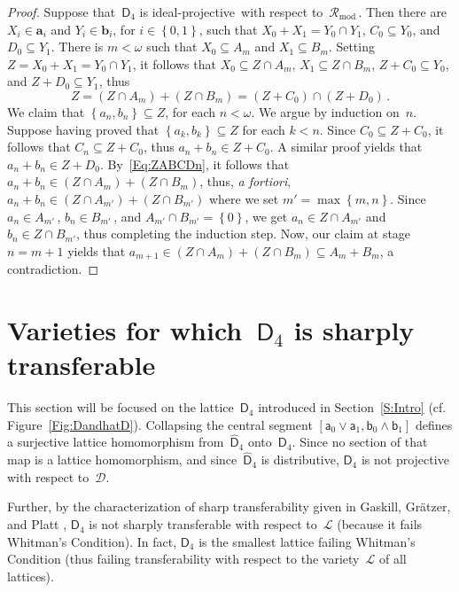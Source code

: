 \documentclass[reqno]{amsart}
\numberwithin{equation}{section}
\theoremstyle{plain}
\theoremstyle{definition}
\theoremstyle{remark}
\numberwithin{figure}{section}
\numberwithin{table}{section}
\begin{document}
\begin{proof}
Suppose that~${\mathsf{D}_{4}}$ is {i\-de\-al-pro\-jec\-tive}\ with respect to~${\mathcal{R}_{\mathrm{mod}}}$\,.
Then there are $X_i\in{\boldsymbol{a}}_i$ and $Y_i\in{\boldsymbol{b}}_i$, for $i\in{\left\{{0,1}\right\}}$, such that $X_0+X_1=Y_0\cap Y_1$, $C_0\subseteq Y_0$, and $D_0\subseteq Y_1$.
There is $m<{\omega}$ such that $X_0\subseteq A_m$ and $X_1\subseteq B_m$.
Setting $Z=X_0+X_1=Y_0\cap Y_1$, it follows that $X_0\subseteq Z\cap A_m$, $X_1\subseteq Z\cap B_m$, $Z+C_0\subseteq Y_0$, and $Z+D_0\subseteq Y_1$, thus
 \begin{equation}\label{Eq:ZABCDn}
 Z=(Z\cap A_m)+(Z\cap B_m)=(Z+C_0)\cap(Z+D_0)\,.
 \end{equation}
We claim that ${\left\{{a_n,b_n}\right\}}\subseteq Z$, for each $n<{\omega}$.
We argue by induction on~$n$.
Suppose having proved that ${\left\{{a_k,b_k}\right\}}\subseteq Z$ for each $k<n$.
Since $C_0\subseteq Z+C_0$, it follows that $C_n\subseteq Z+C_0$, thus $a_n+b_n\in Z+C_0$.
A similar proof yields that $a_n+b_n\in Z+D_0$.
By~\eqref{Eq:ZABCDn}, it follows that $a_n+b_n\in(Z\cap A_m)+(Z\cap B_m)$, thus, \emph{a fortiori}, $a_n+b_n\in(Z\cap A_{m'})+(Z\cap B_{m'})$ where we set $m'=\max{\left\{{m,n}\right\}}$.
Since $a_n\in A_{m'}$\,, $b_n\in B_{m'}$\,, and $A_{m'}\cap B_{m'}={\left\{{0}\right\}}$, we get $a_n\in Z\cap A_{m'}$ and $b_n\in Z\cap B_{m'}$, thus completing the induction step.
Now, our claim at stage $n=m+1$ yields that $a_{m+1}\in(Z\cap A_m)+(Z\cap B_m)\subseteq A_m+B_m$, a contradiction.
\end{proof}

\section[A specific example]{Varieties for which~${\mathsf{D}_{4}}$ is sharply transferable}\label{S:DMgo}

This section will be focused on the lattice~${\mathsf{D}_{4}}$ introduced in Section~\ref{S:Intro} (cf. Figure~\ref{Fig:DandhatD}).
Collapsing the central segment $[{\mathsf{a}}_0\vee{\mathsf{a}}_1,{\mathsf{b}}_0\wedge{\mathsf{b}}_1]$ defines a surjective lattice homomorphism from~${\widehat{\mathsf{D}}_{4}}$ onto~${\mathsf{D}_{4}}$.
Since no section of that map is a lattice homomorphism, and since~${\widehat{\mathsf{D}}_{4}}$ is distributive, ${\mathsf{D}_{4}}$ is not projective with respect to~${\mathcal{D}}$.

Further, by the characterization of sharp transferability given in Gaskill, Gr\"atzer, and Platt \cite[Theorem~4.4]{GaGrPl75}, ${\mathsf{D}_{4}}$ is not sharply transferable with respect to~${\mathcal{L}}$ (because it fails Whitman's Condition).
In fact, ${\mathsf{D}_{4}}$ is the smallest lattice failing Whitman's Condition (thus failing transferability with respect to the variety~${\mathcal{L}}$ of all lattices).
\end{document}
